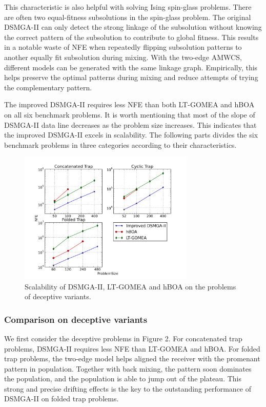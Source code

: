 \documentclass{sig-alternate-05-2015}
\begin{document}
This characteristic is also helpful with solving Ising spin-glass problems. 
There are often two equal-fitness subsolutions in the spin-glass problem.
The original DSMGA-II can only detect the strong linkage of the subsolution without knowing the correct pattern of the subsolution to contribute to global fitness.
This results in a notable waste of NFE when repeatedly flipping subsolution patterns to another equally fit subsolution during mixing.
With the two-edge AMWCS, different models can be generated with the same linkage graph. 
Empirically, this helps preserve the optimal patterns during mixing and reduce attempts of trying the complementary pattern.


The improved DSMGA-II requires less NFE than both LT-GOMEA and hBOA on all six benchmark problems.
It is worth mentioning that most of the slope of DSMGA-II data line decreases as the problem size increases.
This indicates that the improved DSMGA-II excels in scalability.
The following parts divides the six benchmark problems in three categories according to their characteristics. 


\begin{figure}
\centering
\includegraphics[width=3.3in]{trapResults}
\caption{Scalability of DSMGA-II, LT-GOMEA and hBOA on the problems of deceptive variants.}
\end{figure}

\subsubsection{ Comparison on deceptive variants }


We first consider the deceptive problems in Figure 2.
For concatenated trap problems, DSMGA-II requires less NFE than LT-GOMEA and hBOA.
For folded trap problems, the two-edge model helps aligned the receiver with the promenant pattern in population.
Together with back mixing, the pattern soon dominates the population, and the population is able to jump out of the plateau. 
This strong and precise drifting effects is the key to the outstanding performance of DSMGA-II on folded trap problems.
\end{document}
